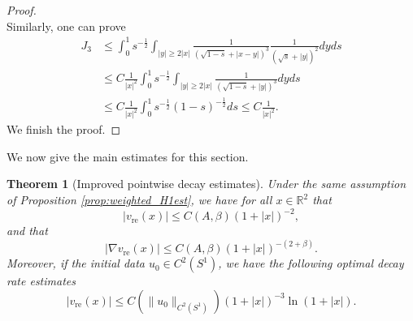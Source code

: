 \documentclass[12pt]{amsart}
\numberwithin{equation}{section}              %
\newtheorem{theorem}{Theorem}[section]
\theoremstyle{remark}
\begin{document}
\begin{proof}
\begin{equation*}
			\end{equation*}
			Similarly, one can prove
			\begin{equation*}
				\begin{aligned}
					J_3 &\leq \int_0^1 s^{-\frac{1}{2}} \int_{ |y|\geq 2|x|} \frac{1}{(\sqrt{1-s}+|x-y|)^3}  \frac{1}{(\sqrt{s}+|y|)^2} dy ds
					\\
					&\leq C\frac{1}{|x|^2}\int_0^1 s^{-\frac{1}{2}} \int_{|y|\geq 2|x|} \frac{1}{(\sqrt{1-s}+|y|)^3}   dy ds
					\\
					&
					\leq C\frac{1}{|x|^2}\int_0^1 s^{-\frac{1}{2}}(1-s)^{-\frac{1}{2}} ds \leq C\frac{1}{|x|^2}.
				\end{aligned}
			\end{equation*}
            We finish the proof.
		\end{proof}
		We now give the main estimates for this section.
		\begin{theorem}[Improved pointwise decay estimates]\label{thm:optimaldecay}
			Under the same assumption of Proposition \ref{prop:weighted_H1est}, we have 
			for all $x \in \mathbb{R}^2$ that 
			\begin{equation*}
				| v_{\text{re}}(x)| \le C(A,\beta)(1+|x|)^{-2},
			\end{equation*}
			and that
			\begin{equation*}
				|\nabla v_{\text{re}}(x)| \le C(A,\beta)(1+|x|)^{-(2+\beta)}.
			\end{equation*}
			Moreover, if the initial data $u_0\in C^2(S^1)$, we have the following optimal decay rate estimates
			\begin{equation*}
				| v_{\text{re}}(x)| \le C(\|u_0\|_{C^2(S^1)})(1+|x|)^{-3}\ln(1+|x|).
			\end{equation*}
		\end{theorem}
		
\end{document}
